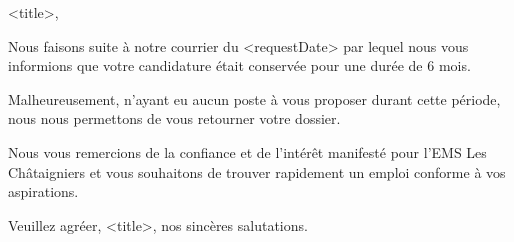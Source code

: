 \documentclass[a4paper, 12pt]{letter}
\begin{document}


<title>,

Nous faisons suite à notre courrier du <requestDate> par lequel nous vous informions que votre candidature était conservée pour une durée de 6 mois.

Malheureusement, n’ayant eu aucun poste à vous proposer durant cette période, nous nous permettons de vous retourner votre dossier. 

Nous vous remercions de la confiance et de l’intérêt manifesté pour l’EMS Les Châtaigniers et vous souhaitons de trouver rapidement un emploi conforme à vos aspirations.

Veuillez agréer, <title>, nos sincères salutations.


\end{document}
